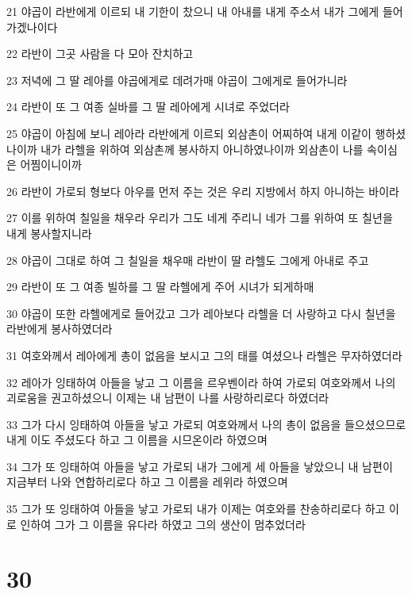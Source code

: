 \par 21 야곱이 라반에게 이르되 내 기한이 찼으니 내 아내를 내게 주소서 내가 그에게 들어가겠나이다
\par 22 라반이 그곳 사람을 다 모아 잔치하고
\par 23 저녁에 그 딸 레아를 야곱에게로 데려가매 야곱이 그에게로 들어가니라
\par 24 라반이 또 그 여종 실바를 그 딸 레아에게 시녀로 주었더라
\par 25 야곱이 아침에 보니 레아라 라반에게 이르되 외삼촌이 어찌하여 내게 이같이 행하셨나이까 내가 라헬을 위하여 외삼촌께 봉사하지 아니하였나이까 외삼촌이 나를 속이심은 어찜이니이까
\par 26 라반이 가로되 형보다 아우를 먼저 주는 것은 우리 지방에서 하지 아니하는 바이라
\par 27 이를 위하여 칠일을 채우라 우리가 그도 네게 주리니 네가 그를 위하여 또 칠년을 내게 봉사할지니라
\par 28 야곱이 그대로 하여 그 칠일을 채우매 라반이 딸 라헬도 그에게 아내로 주고
\par 29 라반이 또 그 여종 빌하를 그 딸 라헬에게 주어 시녀가 되게하매
\par 30 야곱이 또한 라헬에게로 들어갔고 그가 레아보다 라헬을 더 사랑하고 다시 칠년을 라반에게 봉사하였더라
\par 31 여호와께서 레아에게 총이 없음을 보시고 그의 태를 여셨으나 라헬은 무자하였더라
\par 32 레아가 잉태하여 아들을 낳고 그 이름을 르우벤이라 하여 가로되 여호와께서 나의 괴로움을 권고하셨으니 이제는 내 남편이 나를 사랑하리로다 하였더라
\par 33 그가 다시 잉태하여 아들을 낳고 가로되 여호와께서 나의 총이 없음을 들으셨으므로 내게 이도 주셨도다 하고 그 이름을 시므온이라 하였으며
\par 34 그가 또 잉태하여 아들을 낳고 가로되 내가 그에게 세 아들을 낳았으니 내 남편이 지금부터 나와 연합하리로다 하고 그 이름을 레위라 하였으며
\par 35 그가 또 잉태하여 아들을 낳고 가로되 내가 이제는 여호와를 찬송하리로다 하고 이로 인하여 그가 그 이름을 유다라 하였고 그의 생산이 멈추었더라

\chapter{30}


